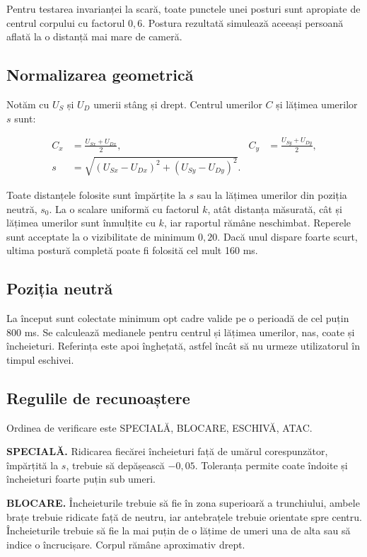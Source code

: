 \documentclass[12pt, a4paper]{article}
\begin{document}
Pentru testarea invarianței la scară, toate punctele unei posturi sunt apropiate de
centrul corpului cu factorul $0{,}6$. Postura rezultată simulează aceeași persoană
aflată la o distanță mai mare de cameră.

\subsection{Normalizarea geometrică}

Notăm cu $U_S$ și $U_D$ umerii stâng și drept. Centrul umerilor $C$ și lățimea
umerilor $s$ sunt:

\begin{align}
C_x &= \frac{U_{Sx}+U_{Dx}}{2}, &
C_y &= \frac{U_{Sy}+U_{Dy}}{2}, \\
s &= \sqrt{(U_{Sx}-U_{Dx})^2+(U_{Sy}-U_{Dy})^2}.
\end{align}

Toate distanțele folosite sunt împărțite la $s$ sau la lățimea umerilor din poziția
neutră, $s_0$. La o scalare uniformă cu factorul $k$, atât distanța măsurată, cât și
lățimea umerilor sunt înmulțite cu $k$, iar raportul rămâne neschimbat. Reperele sunt
acceptate la o vizibilitate de minimum $0{,}20$. Dacă unul dispare foarte scurt,
ultima postură completă poate fi folosită cel mult 160 ms.

\subsection{Poziția neutră}

La început sunt colectate minimum opt cadre valide pe o perioadă de cel puțin 800 ms.
Se calculează medianele pentru centrul și lățimea umerilor, nas, coate și
încheieturi. Referința este apoi înghețată, astfel încât să nu urmeze utilizatorul în
timpul eschivei.

\subsection{Regulile de recunoaștere}

Ordinea de verificare este SPECIALĂ, BLOCARE, ESCHIVĂ, ATAC.

\textbf{SPECIALĂ.} Ridicarea fiecărei încheieturi față de umărul corespunzător,
împărțită la $s$, trebuie să depășească $-0{,}05$. Toleranța permite coate îndoite și
încheieturi foarte puțin sub umeri.

\textbf{BLOCARE.} Încheieturile trebuie să fie în zona superioară a trunchiului,
ambele brațe trebuie ridicate față de neutru, iar antebrațele trebuie orientate spre
centru. Încheieturile trebuie să fie la mai puțin de o lățime de umeri una de alta
sau să indice o încrucișare. Corpul rămâne aproximativ drept.
\end{document}
